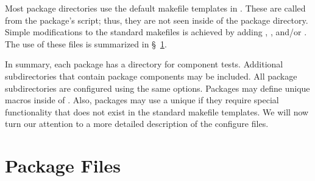 Most package directories use the default makefile templates in
.  These are called from the package's
 script; thus, they are not seen inside of the
package directory.  Simple modifications to the standard makefiles is
achieved by adding , ,
and/or .  The use of these files is summarized in
\S~\ref{sec:package_files}. 

In summary, each package has a  directory for component
tests.  Additional subdirectories that contain package components may
be included.  All package subdirectories are configured using the same
options.  Packages may define unique macros inside of
.  Also, packages may use a unique
 if they require special functionality that does not
exist in the standard makefile templates.  We will now turn our
attention to a more detailed description of the configure files.


\section{Package Files}
\label{sec:package_files}

